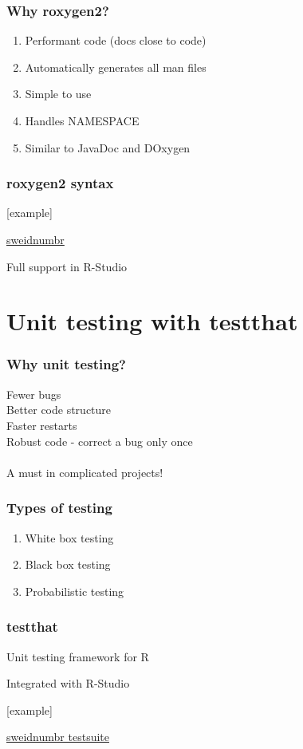 \documentclass{beamer}
\begin{document}
\begin{frame}
	\frametitle{Why roxygen2?}
	\begin{enumerate}
		\item Performant code (docs close to code)
		\item Automatically generates all man files
		\item Simple to use
		\item Handles NAMESPACE
		\item Similar to JavaDoc and DOxygen
	\end{enumerate}
\end{frame}

\begin{frame}
	\frametitle{roxygen2 syntax}
	\centerline{[example]}
	\centerline{}
	\centerline{\href{https://github.com/rOpenGov/sweidnumbr}{sweidnumbr}}

	\centerline{Full support in R-Studio}
\end{frame}

\section{Unit testing with testthat} 

\begin{frame}
	\frametitle{Why unit testing?}
	Fewer bugs \\
	Better code structure \\
	Faster restarts \\
	Robust code - correct a bug only once \\~\\
	
	A must in complicated projects!
\end{frame}

\begin{frame}
	\frametitle{Types of testing}
	\begin{enumerate}
		\item White box testing
		\item Black box testing
		\item Probabilistic testing
	\end{enumerate}
\end{frame}

\begin{frame}
	\frametitle{testthat}
	\centerline{Unit testing framework for R}
	\centerline{Integrated with R-Studio}
	\centerline{}
	\centerline{[example]}
	\centerline{}
	\centerline{\href{https://github.com/rOpenGov/sweidnumbr/tree/master/tests}
		{sweidnumbr testsuite}}
\end{frame}
\end{document}

